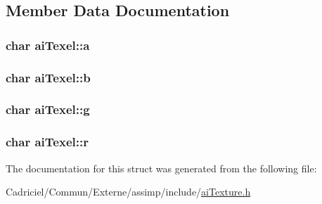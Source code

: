 \subsection{Member Data Documentation}
\hypertarget{structai_texel_a6d4450e83b02b29d24f7aab27958034e}{
\subsubsection[{a}]{ char ai\-Texel\-::a}}\label{structai_texel_a6d4450e83b02b29d24f7aab27958034e}
\hypertarget{structai_texel_a5b4f97f69cf59cb9065af67389599ba6}{
\subsubsection[{b}]{ char ai\-Texel\-::b}}\label{structai_texel_a5b4f97f69cf59cb9065af67389599ba6}
\hypertarget{structai_texel_a41da3516b8241165e4ca58ea8ed68fe6}{
\subsubsection[{g}]{ char ai\-Texel\-::g}}\label{structai_texel_a41da3516b8241165e4ca58ea8ed68fe6}
\hypertarget{structai_texel_ae9408c0d18f6ff597715cc626398a0ff}{
\subsubsection[{r}]{ char ai\-Texel\-::r}}\label{structai_texel_ae9408c0d18f6ff597715cc626398a0ff}


The documentation for this struct was generated from the following file\-:\begin{DoxyCompactItemize}
\item 
Cadriciel/\-Commun/\-Externe/assimp/include/\hyperlink{ai_texture_8h}{ai\-Texture.\-h}\end{DoxyCompactItemize}
